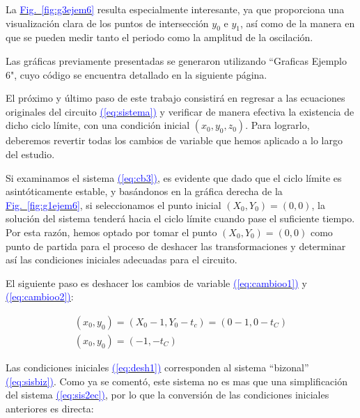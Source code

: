\documentclass[12pt,a4paper]{report} %
\newcommand{\fref}[1]{\hyperref[#1]{\textcolor{blue}{Fig.~\ref*{#1}}}}
\newcommand{\eref}[1]{\hyperref[#1]{\textcolor{blue}{(\ref*{#1})}}}
\begin{document}
	\vspace{0.5cm} La \fref{fig:g3ejem6} resulta especialmente interesante, ya que proporciona una visualización clara de los puntos de intersección $y_0$ e $y_1$, así como de la manera en que se pueden medir tanto el periodo como la amplitud de la oscilación.
	
	\vspace{0.5cm} Las gráficas previamente presentadas se generaron utilizando ``Graficas Ejemplo 6", cuyo código se encuentra detallado en la siguiente página.
	
	\newpage
	
	\vspace{0.5cm}
	
	\newpage
	
	El próximo y último paso de este trabajo consistirá en regresar a las ecuaciones originales del circuito \eref{eq:sistema} y verificar de manera efectiva la existencia de dicho ciclo límite, con una condición inicial $(x_0,y_0,z_0)$. Para lograrlo, deberemos revertir todas los cambios de variable que hemos aplicado a lo largo del estudio. 
	
	\vspace{0.5cm}Si examinamos el sistema \eref{eq:cb3}, es evidente que dado que el ciclo límite es asintóticamente estable, y basándonos en la gráfica derecha de la \fref{fig:g1ejem6},  si seleccionamos el punto inicial $(X_0, Y_0) = (0, 0)$, la solución del sistema tenderá hacia el ciclo límite cuando pase el suficiente tiempo. Por esta razón, hemos optado por tomar el punto $(X_0, Y_0) = (0, 0)$ como punto de partida para el proceso de deshacer las transformaciones y determinar así las condiciones iniciales adecuadas para el circuito.
	
	\vspace{0.5cm}\noindent El siguiente paso es deshacer los cambios de variable \eref{eq:cambioo1} y \eref{eq:cambioo2}:
	
	\begin{equation}
		\label{eq:desh1}
		\begin{gathered}
			(x_0,y_0)=\left( X_0-1,Y_0-t_c \right) = (0-1,0-t_C) \\[5mm]
			(x_0,y_0)=(-1,-t_C)
		\end{gathered}
	\end{equation}\smallskip
	
	
		\vspace{0.5cm} Las condiciones iniciales \eref{eq:desh1} corresponden al sistema ``bizonal'' \eref{eq:sisbiz}. Como ya se comentó, este sistema no es mas que una simplificación del sistema \eref{eq:sis2ec}, por lo que la conversión de las condiciones iniciales anteriores es directa:	
	
\end{document}
